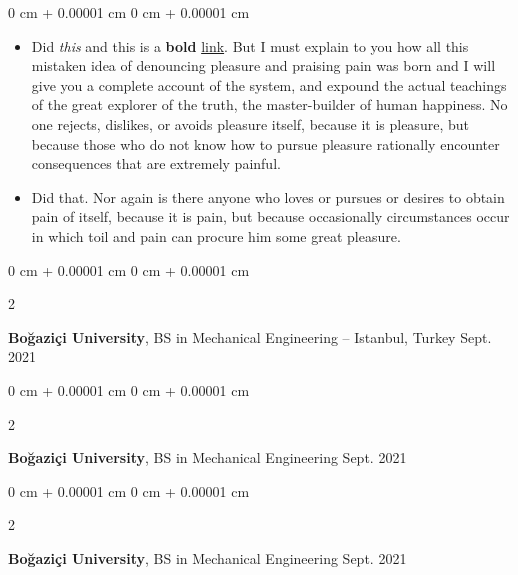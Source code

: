 \documentclass[10pt, letterpaper]{article}
\newenvironment{highlights}{
    \begin{itemize}[
        topsep=0.10 cm,
        parsep=0.10 cm,
        partopsep=0pt,
        itemsep=0pt,
        leftmargin=0 cm + 10pt
    ]
}{
    \end{itemize}
} %
\newenvironment{onecolentry}{
    \begin{adjustwidth}{
        0 cm + 0.00001 cm
    }{
        0 cm + 0.00001 cm
    }
}{
    \end{adjustwidth}
} %
\newenvironment{twocolentry}[2][]{
    \onecolentry
    \def\secondColumn{#2}
    \setcolumnwidth{\fill, 4.5 cm}
    \begin{paracol}{2}
}{
    \switchcolumn \raggedleft \secondColumn
    \end{paracol}
    \endonecolentry
} %
\begin{document}
        \vspace{0.10 cm}
        \begin{onecolentry}
            \begin{highlights}
                \item Did \textit{this} and this is a \textbf{bold} \href{https://example.com}{link}. But I must explain to you how all this mistaken idea of denouncing pleasure and praising pain was born and I will give you a complete account of the system, and expound the actual teachings of the great explorer of the truth, the master-builder of human happiness. No one rejects, dislikes, or avoids pleasure itself, because it is pleasure, but because those who do not know how to pursue pleasure rationally encounter consequences that are extremely painful.
                \item Did that. Nor again is there anyone who loves or pursues or desires to obtain pain of itself, because it is pain, but because occasionally circumstances occur in which toil and pain can procure him some great pleasure.
            \end{highlights}
        \end{onecolentry}


        \vspace{0.2 cm}

        \begin{twocolentry}{
            Sept. 2021
        }
            \textbf{Boğaziçi University}, BS in Mechanical Engineering -- Istanbul, Turkey\end{twocolentry}



        \vspace{0.2 cm}

        \begin{twocolentry}{
            Sept. 2021
        }
            \textbf{Boğaziçi University}, BS in Mechanical Engineering\end{twocolentry}



        \vspace{0.2 cm}

        \begin{twocolentry}{
            Sept. 2021
        }
            \textbf{Boğaziçi University}, BS in Mechanical Engineering\end{twocolentry}



        \vspace{0.2 cm}
\end{document}

